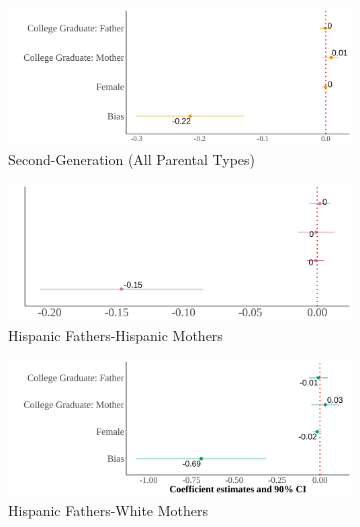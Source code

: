 \documentclass[12pt,english]{article}
\begin{document}
\begin{center}
\begin{figure}[!htb]
\centering
\caption{Relationship Between Self-Reported Hispanic Identity and Bias: By Parental Types County}
\label{plot01-regression-byparent}
\begin{subfigure}{.48\textwidth}
\caption{Second-Generation (All Parental Types)}
\centering
\includegraphics[width=.9\linewidth]{figure/county-by-parents-regs-all.png}
\end{subfigure}
\centering
\begin{subfigure}{.48\textwidth}
\caption{Hispanic Fathers-Hispanic Mothers}
\centering
\includegraphics[width=.9\linewidth]{figure/county-by-parents-regs-hh.png}
\end{subfigure}
\begin{subfigure}{.48\textwidth}
\caption{Hispanic Fathers-White Mothers}
\centering
\includegraphics[width=.9\linewidth]{figure/county-by-parents-regs-hw.png}
\end{subfigure}
\begin{subfigure}{.48\textwidth}

\end{subfigure}
\end{figure}
\end{center}
\end{document}
